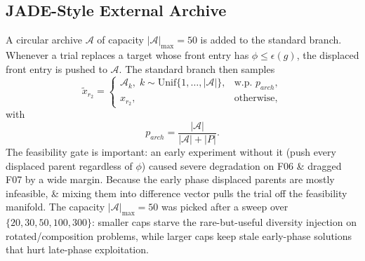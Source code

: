 \documentclass[conference]{IEEEtran}
\begin{document}
\subsection{JADE-Style External Archive}
\label{sec:archive}
A circular archive $\mathcal{A}$ of capacity $|\mathcal{A}|_{\max} = 50$ is added to the standard branch. Whenever a trial replaces a target whose front entry has $\phi \le \epsilon(g)$, the displaced front entry is pushed to $\mathcal{A}$. The standard branch then samples
\begin{equation}
\tilde{x}_{r_2} =
\begin{cases}
\mathcal{A}_k,\; k \sim \mathrm{Unif}\{1,\dots,|\mathcal{A}|\}, & \text{w.p. } p_{arch}, \\
x_{r_2}, & \text{otherwise},
\end{cases}
\label{eq:archive}
\end{equation}
with
\begin{equation}
p_{arch} = \frac{|\mathcal{A}|}{|\mathcal{A}| + |P|}.
\label{eq:parch}
\end{equation}
The feasibility gate is important: an early experiment without it (push every displaced parent regardless of $\phi$) caused severe degradation on F06 \& dragged F07 by a wide margin. Because the early phase displaced parents are mostly infeasible, \& mixing them into difference vector pulls the trial off the feasibility manifold. The capacity $|\mathcal{A}|_{\max} = 50$ was picked after a sweep over $\{20, 30, 50, 100, 300\}$: smaller caps starve the rare-but-useful diversity injection on rotated/composition problems, while larger caps keep stale early-phase solutions that hurt late-phase exploitation.
\end{document}
